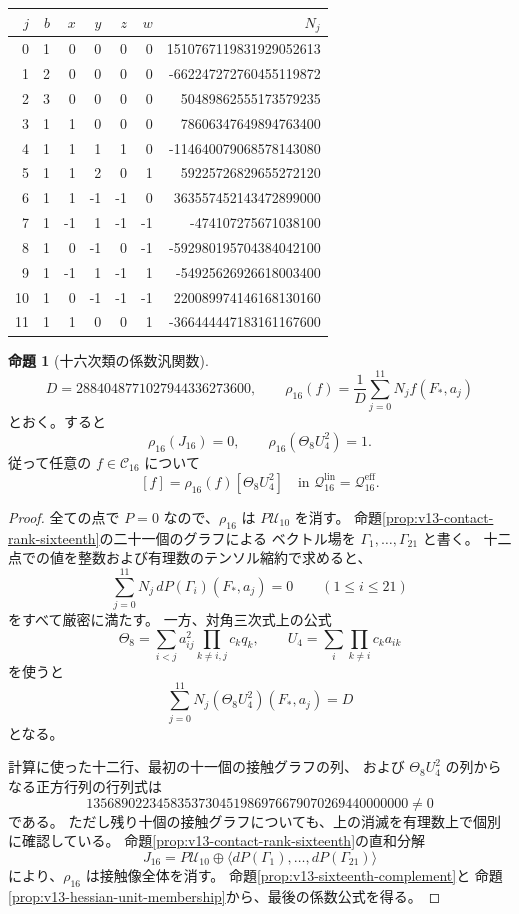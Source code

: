 \documentclass[a4paper,11pt]{ltjsarticle}
\theoremstyle{definition}
\newtheorem{proposition}[theorem]{命題}
\begin{document}
\begin{center}
\small
\begin{tabular}{r|rrrrr|r}
 $j$&$b$&$x$&$y$&$z$&$w$&$N_j$\\ \hline
 0&1&0&0&0&0&1510767119831929052613\\
 1&2&0&0&0&0&-662247272760455119872\\
 2&3&0&0&0&0&50489862555173579235\\
 3&1&1&0&0&0&78606347649894763400\\
 4&1&1&1&1&0&-114640079068578143080\\
 5&1&1&2&0&1&59225726829655272120\\
 6&1&1&-1&-1&0&363557452143472899000\\
 7&1&-1&1&-1&-1&-474107275671038100\\
 8&1&0&-1&0&-1&-592980195704384042100\\
 9&1&-1&1&-1&1&-54925626926618003400\\
 10&1&0&-1&-1&-1&220089974146168130160\\
 11&1&1&0&0&1&-366444447183161167600
\end{tabular}
\end{center}

\begin{proposition}[十六次類の係数汎関数]
\label{prop:v13-diagonal-rho-sixteenth}
\[
 D=2884048771027944336273600,\qquad
 \rho_{16}(f)=\frac1D\sum_{j=0}^{11}N_j f(F_*,a_j)
\]
とおく。すると
\[
 \rho_{16}(J_{16})=0,\qquad
 \rho_{16}(\Theta_8U_4^2)=1.
\]
従って任意の $f\in\mathcal C_{16}$ について
\[
 [f]=\rho_{16}(f)[\Theta_8U_4^2]
 \quad\text{in }\mathcal Q^{\mathrm{lin}}_{16}
                   =\mathcal Q^{\mathrm{eff}}_{16}.
\]
\end{proposition}

\begin{proof}
全ての点で $P=0$ なので、$\rho_{16}$ は
$P\mathcal U_{10}$ を消す。
命題\ref{prop:v13-contact-rank-sixteenth}の二十一個のグラフによる
ベクトル場を $\Gamma_1,\ldots,\Gamma_{21}$ と書く。
十二点での値を整数および有理数のテンソル縮約で求めると、
\[
 \sum_{j=0}^{11}N_j\,dP(\Gamma_i)(F_*,a_j)=0
 \qquad(1\le i\le21)
\]
をすべて厳密に満たす。
一方、対角三次式上の公式
\[
 \Theta_8=\sum_{i<j}a_{ij}^2\prod_{k\ne i,j}c_kq_k,\qquad
 U_4=\sum_i\prod_{k\ne i}c_k a_{ik}
\]
を使うと
\[
 \sum_{j=0}^{11}N_j(\Theta_8U_4^2)(F_*,a_j)=D
\]
となる。

計算に使った十二行、最初の十一個の接触グラフの列、
および $\Theta_8U_4^2$ の列からなる正方行列の行列式は
\[
 1356890223458353730451986976679070269440000000\ne0
\]
である。
ただし残り十個の接触グラフについても、上の消滅を有理数上で個別に確認している。
命題\ref{prop:v13-contact-rank-sixteenth}の直和分解
\[
 J_{16}=P\mathcal U_{10}\oplus
           \langle dP(\Gamma_1),\ldots,dP(\Gamma_{21})\rangle
\]
により、$\rho_{16}$ は接触像全体を消す。
命題\ref{prop:v13-sixteenth-complement}と
命題\ref{prop:v13-hessian-unit-membership}から、最後の係数公式を得る。
\end{proof}
\end{document}
